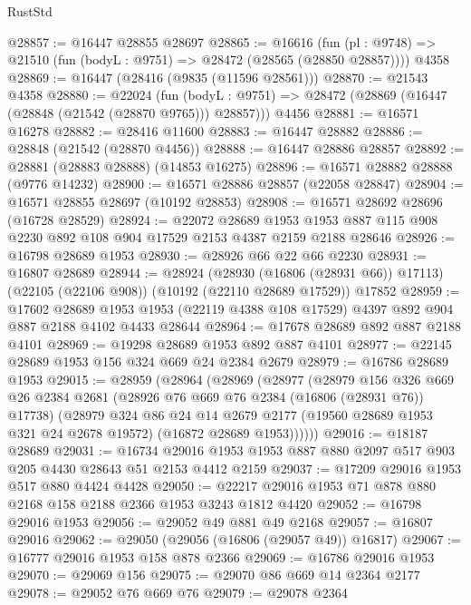 \begin{lexlean}{RustStd}
\begin{coremodule}
@28857 := @16447 @28855 @28697
@28865 := @16616
    (fun (pl : @9748) => @21510 (fun (bodyL : @9751) => @28472 (@28565 (@28850 @28857))))
    @4358
@28869 := @16447 (@28416 (@9835 (@11596 @28561)))
@28870 := @21543 @4358
@28880 := @22024
    (fun (bodyL : @9751) => @28472 (@28869 (@16447 (@28848 (@21542 (@28870 @9765))) @28857)))
    @4456
@28881 := @16571 @16278
@28882 := @28416 @11600
@28883 := @16447 @28882
@28886 := @28848 (@21542 (@28870 @4456))
@28888 := @16447 @28886 @28857
@28892 := @28881 (@28883 @28888) (@14853 @16275)
@28896 := @16571 @28882 @28888 (@9776 @14232)
@28900 := @16571 @28886 @28857 (@22058 @28847)
@28904 := @16571 @28855 @28697 (@10192 @28853)
@28908 := @16571 @28692 @28696 (@16728 @28529)
@28924 := @22072
    @28689
    @1953
    @1953
    @887
    @115
    @908
    @2230
    @892
    @108
    @904
    @17529
    @2153
    @4387
    @2159
    @2188
    @28646
@28926 := @16798 @28689 @1953
@28930 := @28926 @66 @22 @66 @2230
@28931 := @16807 @28689
@28944 := @28924
    (@28930 (@16806 (@28931 @66)) @17113)
    (@22105 (@22106 @908))
    (@10192 (@22110 @28689 @17529))
    @17852
@28959 := @17602
    @28689
    @1953
    @1953
    (@22119 @4388 @108 @17529)
    @4397
    @892
    @904
    @887
    @2188
    @4102
    @4433
    @28644
@28964 := @17678 @28689 @892 @887 @2188 @4101
@28969 := @19298 @28689 @1953 @892 @887 @4101
@28977 := @22145 @28689 @1953 @156 @324 @669 @24 @2384 @2679
@28979 := @16786 @28689 @1953
@29015 := @28959
    (@28964
      (@28969
        (@28977
          (@28979
            @156
            @326
            @669
            @26
            @2384
            @2681
            (@28926 @76 @669 @76 @2384 (@16806 (@28931 @76)) @17738)
            (@28979
              @324
              @86
              @24
              @14
              @2679
              @2177
              (@19560 @28689 @1953 @321 @24 @2678 @19572)
              (@16872 @28689 @1953))))))
@29016 := @18187 @28689
@29031 := @16734
    @29016
    @1953
    @1953
    @887
    @880
    @2097
    @517
    @903
    @205
    @4430
    @28643
    @51
    @2153
    @4412
    @2159
@29037 := @17209 @29016 @1953 @517 @880 @4424 @4428
@29050 := @22217 @29016 @1953 @71 @878 @880 @2168 @158 @2188 @2366 @1953 @3243 @1812 @4420
@29052 := @16798 @29016 @1953
@29056 := @29052 @49 @881 @49 @2168
@29057 := @16807 @29016
@29062 := @29050 (@29056 (@16806 (@29057 @49)) @16817)
@29067 := @16777 @29016 @1953 @158 @878 @2366
@29069 := @16786 @29016 @1953
@29070 := @29069 @156
@29075 := @29070 @86 @669 @14 @2364 @2177
@29078 := @29052 @76 @669 @76
@29079 := @29078 @2364

\end{coremodule}
\end{lexlean}
